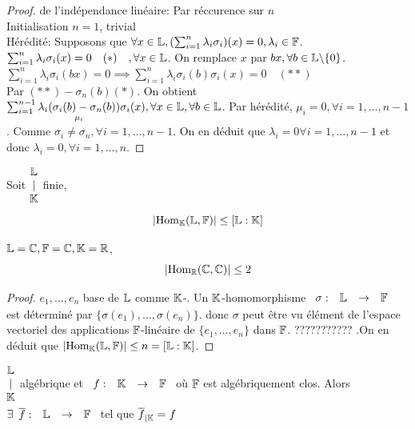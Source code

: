 \documentclass[]{report}
\begin{document}
    \begin{proof}
        de l'indépendance linéaire: Par réccurence sur $n$\\
        Initialisation $n=1$, trivial\\
        Hérédité: Supposons que $\forall x\in \mathbb{L}, (\sum_{i=1}^{n}\lambda_i\sigma_i)(x)=0,\lambda_i\in \mathbb{F}$.\\
        $\sum_{i=1}^{n}\lambda_i\sigma_i(x)=0 \quad(*)\quad ,\forall x\in \mathbb{L}$. On remplace $x$ par $b x,\forall b\in \mathbb{L}\backslash\{0\}$. $\sum_{i=1}^{n}\lambda_i\sigma_i(bx)=0\implies \sum_{i=1}^{n}\lambda_i\sigma_i(b)\sigma_i(x)=0 \quad (**)$\\
        Par $(**)-\sigma_n(b)(*)$. On obtient $\sum_{i=1}^{n-1}\underset{\mu_i}{\lambda_i(\sigma_i(b)-\sigma_n(b))}\sigma_i(x),\forall x\in \mathbb{L},\forall b\in \mathbb{L}$. Par hérédité, $\mu_i=0,\forall i=1,\ldots,n-1$. Comme $\sigma_i\neq\sigma_n,\forall i=1,\ldots,n-1$. On en déduit que $\lambda_i=0\forall i=1,\ldots,n-1$ et donc $\lambda_i=0,\forall i=1,\ldots,n$.
    \end{proof}

    \begin{lm}{}{}
        Soit $\begin{matrix}
            \mathbb{L}\\
            |\\
            \mathbb{K}
        \end{matrix}$ finie,
        \[|\text{Hom}_{\mathbb{K}}(\mathbb{L},\mathbb{F})|\le \left[ \mathbb{L}:\mathbb{K}\right]\]
    \end{lm}

    \begin{ex}{}{}
        $\mathbb{L}=\mathbb{C},\mathbb{F}=\mathbb{C},\mathbb{K}=\mathbb{R}$,
        \[|\text{Hom}_{\mathbb{R}}(\mathbb{C},\mathbb{C})|\le 2\]
    \end{ex}

    \begin{proof}
        $e_1,\ldots,e_n$ base de $\mathbb{L}$ comme $\mathbb{K}$-\ev. Un $\mathbb{K}$-homomorphisme $\begin{array}{ccccc} \sigma : & \mathbb{L} & \to & \mathbb{F} \end{array}$ est déterminé par $\{\sigma(e_1),\ldots,\sigma(e_n)\}$. donc $\sigma$ peut être vu élément de l'espace vectoriel des applications $\mathbb{F}$-linéaire de $\{e_1,\ldots,e_n\}$ dans $\mathbb{F}$. ??????????? .On en déduit que $|\text{Hom}_{\mathbb{K}}(\mathbb{L},\mathbb{F})|\le n=[\mathbb{L}:\mathbb{K}]$.
    \end{proof}

    \begin{lm}{}{}
        $\begin{matrix}
            \mathbb{L}\\
            |\\
            \mathbb{K}
        \end{matrix}$ algébrique et $\begin{array}{ccccc} f : & \mathbb{K} & \to & \mathbb{F} \end{array}$ où $\mathbb{F}$ est algébriquement clos. Alors $\exists \begin{array}{ccccc} \overline{f} : & \mathbb{L} & \to & \mathbb{F} \end{array}$ tel que $\overline{f}_{|\mathbb{K}}=f$
    \end{lm}
\end{document}
